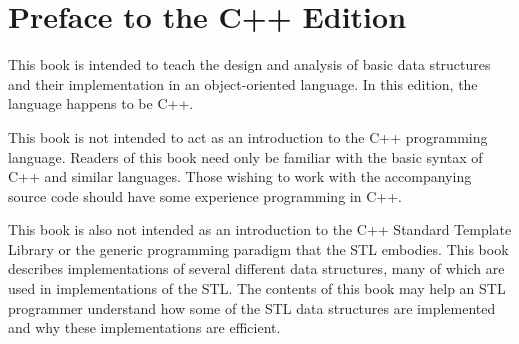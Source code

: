 \chapter*{Preface to the C++ Edition}

This book is intended to teach the design and analysis of basic data
structures and their implementation in an object-oriented language.
In this edition, the language happens to be C++.

This book is not intended to act as an introduction to the C++ programming
language.  Readers of this book need only be familiar with the basic
syntax of C++ and similar languages.  Those wishing to work with the
accompanying source code should have some experience programming in C++.

This book is also not intended as an introduction to the C++ Standard
Template Library or the generic programming paradigm that the STL
embodies.  This book describes implementations of several different data
structures, many of which are used in implementations of the STL. The
contents of this book may help an STL programmer understand how some of
the STL data structures are implemented and why these implementations
are efficient.
